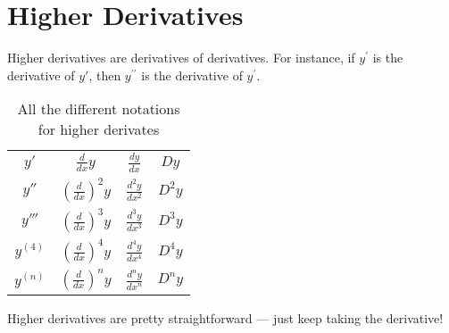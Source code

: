 \documentclass[../main.tex]{subfiles}
\begin{document}
\chapter{Higher Derivatives}
Higher derivatives are derivatives of derivatives. 
For instance, if $y^\prime$ is the derivative of $y'$, 
then $y^{\prime\prime}$ is the derivative of $y^\prime$.
\begin{table}[h]
    \centering
    \caption{All the different notations for higher derivates}
    \label{tab:notations}
    \begin{tabular}{c|c|c|c}
    $y'$      & $\frac{d}{dx}y$                   & $\frac{dy}{dx}$     & $Dy$   \\
    $y''$     & $\left( \frac{d}{dx} \right)^2 y$ & $\frac{d^2y}{dx^2}$ & $D^2y$ \\
    $y'''$    & $\left( \frac{d}{dx} \right)^3 y$ & $\frac{d^3y}{dx^3}$ & $D^3y$ \\
    $y^{(4)}$ & $\left( \frac{d}{dx} \right)^4 y$ & $\frac{d^4y}{dx^4}$ & $D^4y$ \\
    $y^{(n)}$ & $\left( \frac{d}{dx} \right)^n y$ & $\frac{d^ny}{dx^n}$ & $D^ny$
    \end{tabular}
    \end{table}

Higher derivatives are pretty straightforward --- 
just keep taking the derivative!
\end{document}
